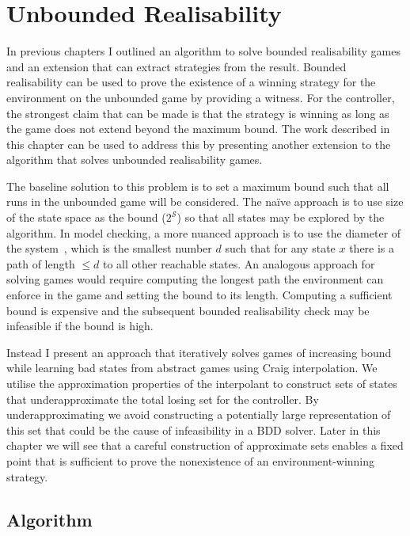 \chapter{Unbounded Realisability}
\label{ch:unbounded}

\newtheorem*{exmpInt}{Example: Why we use interpolants}

In previous chapters I outlined an algorithm to solve bounded realisability games and an extension that can extract strategies from the result. Bounded realisability can be used to prove the existence of a winning strategy for the environment on the unbounded game by providing a witness. For the controller, the strongest claim that can be made is that the strategy is winning as long as the game does not extend beyond the maximum bound. The work described in this chapter can be used to address this by presenting another extension to the algorithm that solves unbounded realisability games.

The baseline solution to this problem is to set a maximum bound such that all runs in the unbounded game will be considered. The na\"ive approach is to use size of the state space as the bound ($2^\mathcal{S}$) so that all states may be explored by the algorithm. In model checking, a more nuanced approach is to use the diameter of the system~\cite{Biere99}, which is the smallest number $d$ such that for any state $x$ there is a path of length $\leq d$ to all other reachable states. An analogous approach for solving games would require computing the longest path the environment can enforce in the game and setting the bound to its length. Computing a sufficient bound is expensive and the subsequent bounded realisability check may be infeasible if the bound is high.

Instead I present an approach that iteratively solves games of increasing
bound while learning bad states from abstract games using Craig interpolation. We utilise the approximation properties of the interpolant to construct sets of states that underapproximate the total losing set for the controller. By underapproximating we avoid constructing a potentially large representation of this set that could be the cause of infeasibility in a BDD solver. Later in this chapter we will see that a careful construction of approximate sets enables a fixed point that is sufficient to prove the nonexistence of an environment-winning strategy.

\section{Algorithm}
\label{sec:unboundedAlgorithm}


